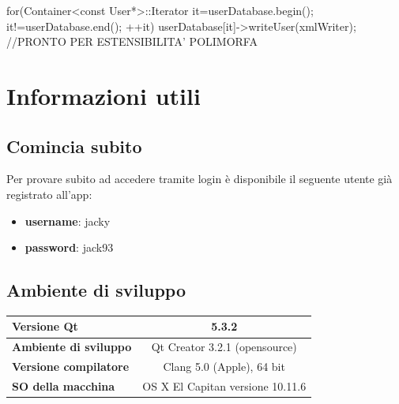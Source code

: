 \documentclass[10pt,a4paper,openany]{article}
\begin{document}
\begin{CPP}
for(Container<const User*>::Iterator it=userDatabase.begin(); it!=userDatabase.end(); ++it)
	userDatabase[it]->writeUser(xmlWriter);	//PRONTO PER ESTENSIBILITA' POLIMORFA
\end{CPP}

\newpage

\section{Informazioni utili}\vspace{10pt}


	\subsection{Comincia subito}
	Per provare subito ad accedere tramite login è disponibile il seguente utente già registrato all'app:

	\begin{itemize}
	\item \textbf{username}: jacky
	\item \textbf{password}: jack93
	\end{itemize}\vspace{20pt}
	
	
	\subsection{Ambiente di sviluppo}

	\def\arraystretch{1.7}%
	\begin{tabular}{|l|c|}
	\hline
	\textbf{Versione Qt} & {5.3.2}  \\
	\hline
	\textbf{Ambiente di sviluppo} & Qt Creator 3.2.1 (opensource) \\
	\hline
	\textbf{Versione compilatore} & Clang 5.0 (Apple), 64 bit \\
	\hline
	\textbf{SO della macchina} & OS X El Capitan versione 10.11.6 \\
	\hline
	\end{tabular}
	





	

\end{document}
